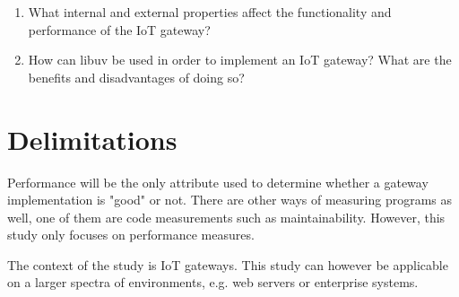 \begin{enumerate}

    \item What internal and external properties affect the functionality and
        performance of the IoT gateway?

    \item How can libuv be used in order to implement an IoT gateway? What are
        the benefits and disadvantages of doing so?

\end{enumerate}

\section{Delimitations}
\label{sec:delimitations}

Performance will be the only attribute used to determine whether a gateway
implementation is "good" or not. There are other ways of measuring programs as
well, one of them are code measurements such as maintainability. However, this
study only focuses on performance measures.

The context of the study is IoT gateways. This study can however be applicable
on a larger spectra of environments, e.g. web servers or enterprise systems.
